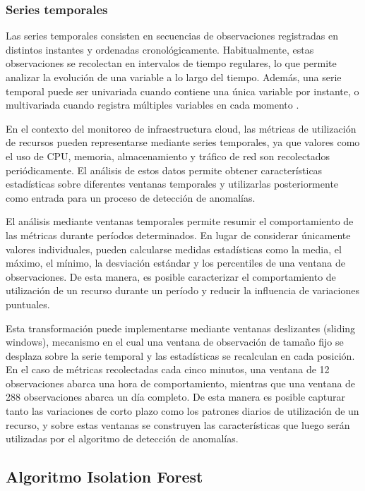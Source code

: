 \subsubsection{Series temporales}

Las series temporales consisten en secuencias de observaciones registradas en distintos instantes y ordenadas cronológicamente. Habitualmente, estas observaciones se recolectan en intervalos de tiempo regulares, lo que permite analizar la evolución de una variable a lo largo del tiempo. Además, una serie temporal puede ser univariada cuando contiene una única variable por instante, o multivariada cuando registra múltiples variables en cada momento \parencite{Haben2023}.

En el contexto del monitoreo de infraestructura cloud, las métricas de utilización de recursos pueden representarse mediante series temporales, ya que valores como el uso de CPU, memoria, almacenamiento y tráfico de red son recolectados periódicamente. El análisis de estos datos permite obtener características estadísticas sobre diferentes ventanas temporales y utilizarlas posteriormente como entrada para un proceso de detección de anomalías.

El análisis mediante ventanas temporales permite resumir el comportamiento de las métricas durante períodos determinados. En lugar de considerar únicamente valores individuales, pueden calcularse medidas estadísticas como la media, el máximo, el mínimo, la desviación estándar y los percentiles de una ventana de observaciones. De esta manera, es posible caracterizar el comportamiento de utilización de un recurso durante un período y reducir la influencia de variaciones puntuales.

Esta transformación puede implementarse mediante ventanas deslizantes (sliding windows), mecanismo en el cual una ventana de observación de tamaño fijo se desplaza sobre la serie temporal y las estadísticas se recalculan en cada posición. En el caso de métricas recolectadas cada cinco minutos, una ventana de 12 observaciones abarca una hora de comportamiento, mientras que una ventana de 288 observaciones abarca un día completo. De esta manera es posible capturar tanto las variaciones de corto plazo como los patrones diarios de utilización de un recurso, y sobre estas ventanas se construyen las características que luego serán utilizadas por el algoritmo de detección de anomalías.

\subsection{Algoritmo Isolation Forest}

